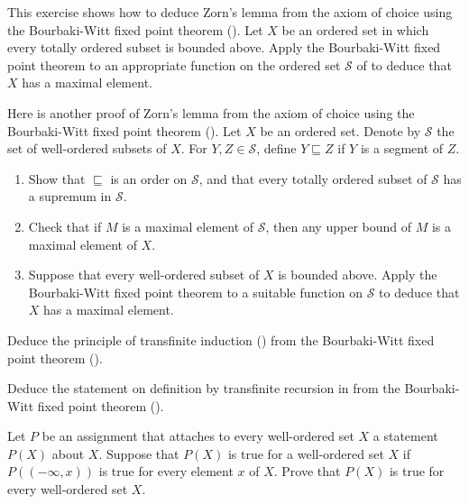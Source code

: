 \documentclass{article}
\begin{document}
\begin{exercise}
  \label{exe:h4ww3mr2}
  This exercise shows how to deduce Zorn's lemma from the axiom of
  choice using the Bourbaki-Witt fixed point theorem
  ().  Let \(X\) be an ordered set in which every
  totally ordered subset is bounded above.  Apply the Bourbaki-Witt
  fixed point theorem to an appropriate function on the ordered set
  \(\mathcal{S}\) of  to deduce that \(X\) has a
  maximal element.
\end{exercise}

\begin{exercise}
  \label{exe:51daga9q}
  Here is another proof of Zorn's lemma from the axiom of choice using
  the Bourbaki-Witt fixed point theorem ().  Let
  \(X\) be an ordered set.  Denote by \(\mathcal{S}\) the set of
  well-ordered subsets of \(X\).  For \(Y, Z \in \mathcal{S}\), define
  \(Y \sqsubseteq Z\) if \(Y\) is a segment of \(Z\).
  \begin{enumerate}
  \item \label{item:j6hjwyxg} Show that \(\sqsubseteq\) is an order on
    \(\mathcal{S}\), and that every totally ordered subset of
    \(\mathcal{S}\) has a supremum in \(\mathcal{S}\).
  \item \label{item:41f56yw7} Check that if \(M\) is a maximal element
    of \(\mathcal{S}\), then any upper bound of \(M\) is a maximal
    element of \(X\).
  \item Suppose that every well-ordered subset of \(X\) is bounded
    above.  Apply the Bourbaki-Witt fixed point theorem to a suitable
    function on \(\mathcal{S}\) to deduce that \(X\) has a maximal
    element.
  \end{enumerate}
\end{exercise}

\begin{exercise}
  \label{exe:y5zl49rq}
  Deduce the principle of transfinite induction ()
  from the Bourbaki-Witt fixed point theorem ().
\end{exercise}

\begin{exercise}
  \label{exe:ouafuvlu}
  Deduce the statement on definition by transfinite recursion in
   from the Bourbaki-Witt fixed point theorem
  ().
\end{exercise}

\begin{exercise}
  \label{exe:wtzok6gt}
  Let \(P\) be an assignment that attaches to every well-ordered set
  \(X\) a statement \(P(X)\) about \(X\).  Suppose that \(P(X)\) is
  true for a well-ordered set \(X\) if \(P((-\infty, x))\) is true for
  every element \(x\) of \(X\).  Prove that \(P(X)\) is true for every
  well-ordered set \(X\).
\end{exercise}
\end{document}
